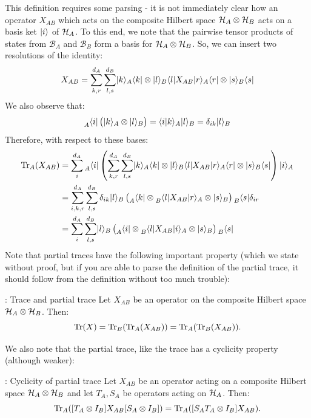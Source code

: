 This definition requires some parsing - it is not immediately clear how an operator $X_{AB}$ which acts on the composite Hilbert space $\mathcal{H}_A \otimes \mathcal{H}_B$ acts on a basis ket $\lvert i \rangle$ of $\mathcal{H}_A$. To this end, we note that the pairwise tensor products of states from $\mathcal{B}_A$ and $\mathcal{B}_B$ form a basis for $\mathcal{H}_A \otimes \mathcal{H}_B$. So, we can insert two resolutions of the identity:
\begin{equation}
    X_{AB} = \sum_{k, r}^{d_A} \sum_{l, s}^{d_B} \lvert k \rangle_A\langle k \rvert \otimes \lvert l \rangle_B\langle l \rvert X_{AB}\lvert r \rangle_A\langle r \rvert \otimes \lvert s \rangle_B\langle s \rvert
\end{equation}
We also observe that:
\begin{equation}
    \prescript{}{A}{\langle i \rvert}\left(\lvert k \rangle_A \otimes \lvert l \rangle_B\right) = \langle i \lvert k \rangle_A \lvert l \rangle_B = \delta_{ik}\lvert l \rangle_B
\end{equation}
Therefore, with respect to these bases:
\begin{equation}
    \begin{split}
        \mathrm{Tr}_A(X_{AB}) &= \sum_i^{d_A} \prescript{}{A}{\langle i \rvert} \left(\sum_{k, r}^{d_A} \sum_{l, s}^{d_B} \lvert k \rangle_A\langle k \rvert \otimes \lvert l \rangle_B\langle l \rvert X_{AB}\lvert r \rangle_A\langle r \rvert \otimes \lvert s \rangle_B\langle s \rvert\right)\lvert i \rangle_A
        \\ &= \sum_{i, k, r}^{d_A}\sum_{l, s}^{d_B} \delta_{ik}\lvert l \rangle_B\left(\prescript{}{A}{\langle k \rvert} \otimes \prescript{}{B}{\langle l \rvert}X_{AB}\lvert r \rangle_A \otimes \lvert s \rangle_B\right)\prescript{}{B}{\langle s \rvert}\delta_{ir}
        \\ &= \sum_{i}^{d_A}\sum_{l, s}^{d_B} \lvert l \rangle_B\left(\prescript{}{A}{\langle i \rvert} \otimes \prescript{}{B}{\langle l \rvert}X_{AB}\lvert i \rangle_A \otimes \lvert s \rangle_B\right)\prescript{}{B}{\langle s \rvert}
    \end{split}
\end{equation}
Note that partial traces have the following important property (which we state without proof, but if you are able to parse the definition of the partial trace, it should follow from the definition without too much trouble):
\begin{propbox}{: Trace and partial trace}
    Let $X_{AB}$ be an operator on the composite Hilbert space $\mathcal{H}_A \otimes \mathcal{H}_B$. Then:
    \begin{equation}
        \mathrm{Tr}(X) = \mathrm{Tr}_B(\mathrm{Tr}_A(X_{AB})) = \mathrm{Tr}_A(\mathrm{Tr}_B(X_{AB})).
    \end{equation}
\end{propbox}

We also note that the partial trace, like the trace has a cyclicity property (although weaker):
\begin{propbox}{: Cyclicity of partial trace}
    Let $X_{AB}$ be an operator acting on a composite Hilbert space $\mathcal{H}_A \otimes \mathcal{H}_B$ and let $T_A, S_A$ be operators acting on $\mathcal{H}_A$. Then:
    \begin{equation}
        \mathrm{Tr}_A([T_A \otimes I_B] X_{AB} [S_A \otimes I_B]) = \mathrm{Tr}_A([S_AT_A \otimes I_B]X_{AB}).
    \end{equation}
\end{propbox}



